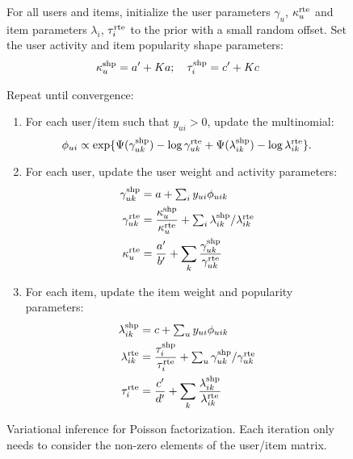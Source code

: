 \begin{figure}[th]
  \begin{framed}
    For all users and items, initialize the user parameters
    $\gamma_u$, $\kappa_u^{\textrm{rte}}$ and item parameters $\lambda_i$,
    $\tau_i^{\textrm{rte}}$ to the prior with a small random offset. Set the
    user activity and item popularity shape parameters:
    \begin{align}
      \kappa_u^{\textrm{shp}} = a' + Ka; \quad \tau_i^{\textrm{shp}} = c' + Kc\nonumber
    \end{align}


    Repeat until convergence:
    \begin{enumerate}
    \item For each user/item such that $y_{ui} > 0$, update the multinomial:
      \begin{equation*}
        \phi_{ui} \propto \exp\{\Psi(\gamma_{uk}^{\textrm{shp}}) - \log
        \gamma_{uk}^{\textrm{rte}} + \Psi(\lambda_{ik}^{\textrm{shp}}) - \log
        \lambda_{ik}^{\textrm{rte}}\}.
      \end{equation*}
    \item For each user, update the user weight and activity parameters:
      \begin{align}
        \gamma_{uk}^{\textrm{shp}} & = a + \textstyle \sum_{i} y_{ui}
        \phi_{uik} \nonumber\\
        \gamma_{uk}^{\textrm{rte}} & = \frac{\kappa_u^{\textrm{shp}}}{\kappa_u^{\textrm{rte}}} + \textstyle \sum_i \lambda_{ik}^{\textrm{shp}} / \lambda_{ik}^{\textrm{rte}}\nonumber\\
        \kappa_{u}^{\textrm{rte}} & = \frac{a'}{b'} + \sum_k \frac{\gamma_{uk}^{\textrm{shp}}}{\gamma_{uk}^{\textrm{rte}}}\nonumber
      \end{align}
    \item For each item, update the item weight and popularity parameters:
      \begin{align}
        \lambda_{ik}^{\textrm{shp}} & = c + \textstyle \sum_{u} y_{ui}
        \phi_{uik}\nonumber\\
        \lambda_{ik}^{\textrm{rte}} & = \frac{\tau_i^{\textrm{shp}}}{\tau_i^{\textrm{rte}}} + \textstyle \sum_u
        \gamma_{uk}^{\textrm{shp}} / \gamma_{uk}^{\textrm{rte}}\nonumber\\
        \tau_{i}^{\textrm{rte}} & = \frac{c'}{d'} + \sum_k \frac{\lambda_{ik}^{\textrm{shp}}}{\lambda_{ik}^{\textrm{rte}}}\nonumber
      \end{align}
    \end{enumerate}
    \vspace{-0.2in}
\end{framed}
    \vspace{-0.2in}
\caption{\label{fig:batch}Variational inference for Poisson
  factorization.  Each iteration only needs to consider the non-zero
  elements of the user/item matrix.}
\end{figure}


